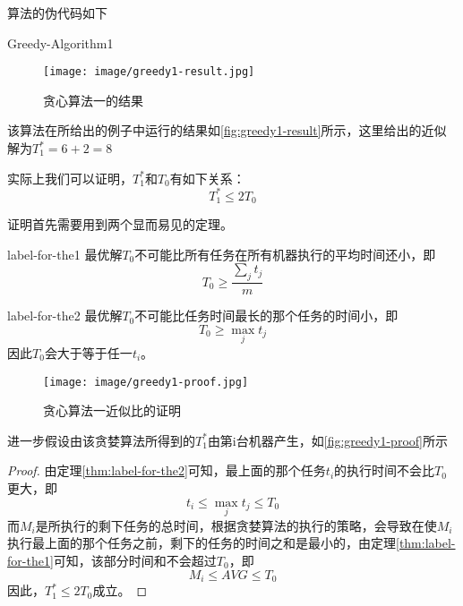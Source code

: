 算法的伪代码如下

\begin{algorithm}
	\DontPrintSemicolon{}
	\caption{Greedy-Algorithm1}\label{greedy1-algo}
\end{algorithm}

\begin{figure}[hbt]
	\centering
	\texttt{[image: image/greedy1-result.jpg]}
	\caption{贪心算法一的结果}\label{fig:greedy1-result}
\end{figure}
该算法在所给出的例子中运行的结果如\autoref{fig:greedy1-result}所示，这里给出的近似解为$T_1^*=6+2=8$

实际上我们可以证明，$T_1^*$和$T_0$有如下关系：
\begin{equation*}
	T_1^*\leq 2T_0
\end{equation*}

证明首先需要用到两个显而易见的定理。
\begin{theorem}{}{label-for-the1}
	最优解$T_0$不可能比所有任务在所有机器执行的平均时间还小，即
	\begin{equation*}
		T_0\geq \frac{\sum_j t_j}{m}
	\end{equation*}
\end{theorem}

\begin{theorem}{}{label-for-the2}
	最优解$T_0$不可能比任务时间最长的那个任务的时间小，即
	\begin{equation*}
		T_0\geq \max_j t_j
	\end{equation*}
	因此$T_0$会大于等于任一$t_i$。
\end{theorem}

\begin{figure}[hbt]
	\centering
	\texttt{[image: image/greedy1-proof.jpg]}
	\caption{贪心算法一近似比的证明}\label{fig:greedy1-proof}
\end{figure}
进一步假设由该贪婪算法所得到的$T_1^*$由第i台机器产生，如\autoref{fig:greedy1-proof}所示

\begin{proof}
	由定理\ref{thm:label-for-the2}可知，最上面的那个任务$t_i$的执行时间不会比$T_0$更大，即
	\begin{equation*}
		t_i \leq \max_j t_j \leq T_0
	\end{equation*}
	而$M_i$是所执行的剩下任务的总时间，根据贪婪算法的执行的策略，会导致在使$M_i$执行最上面的那个任务之前，剩下的任务的时间之和是最小的，由定理\ref{thm:label-for-the1}可知，该部分时间和不会超过$T_0$，即
	\begin{equation*}
		M_i \leq AVG \leq T_0
	\end{equation*}
	因此，$T_1^*\leq 2T_0$成立。
\end{proof}

